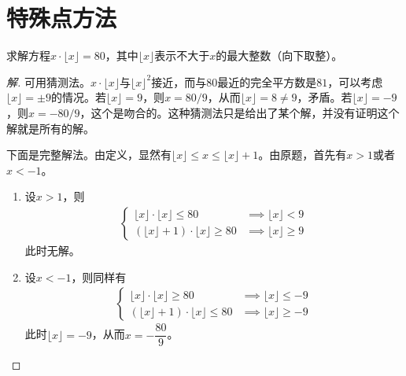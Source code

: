\section{特殊点方法}
\label{sec:special-point-method}

\begin{example}
  求解方程$x\cdot \lfloor x\rfloor=80$，其中$\lfloor x\rfloor$表示不大于$x$的最大整数（向下取整）。
\end{example}
\begin{proof}[解]
  可用猜测法。$x\cdot \lfloor x\rfloor$与$\lfloor x\rfloor ^2$接近，而与$80$最近的完全平方数是$81$，可以考虑$\lfloor x\rfloor=\pm 9$的情况。若$\lfloor x\rfloor=9$，则$x=80/9$，从而$\lfloor x\rfloor=8\ne 9$，矛盾。若$\lfloor x\rfloor=-9$，则$x=-80/9$，这个是吻合的。这种猜测法只是给出了某个解，并没有证明这个解就是所有的解。

  下面是完整解法。由定义，显然有$\lfloor x\rfloor\le x \le \lfloor x\rfloor + 1$。由原题，首先有$x>1$或者$x<-1$。

  \begin{enumerate}
  \item 设$x>1$，则
    \begin{align*}
      \begin{cases}
        \lfloor x\rfloor \cdot \lfloor x\rfloor  \le 80 &\implies \lfloor x\rfloor < 9\\
        \left(\lfloor x\rfloor + 1\right)\cdot \lfloor x\rfloor \ge 80 &\implies \lfloor x\rfloor \ge 9
      \end{cases}
    \end{align*}
    此时无解。
  \item 设$x<-1$，则同样有
    \begin{align*}
      \begin{cases}
        \lfloor x\rfloor \cdot \lfloor x\rfloor  \ge 80 &\implies \lfloor x\rfloor \le -9\\
        \left(\lfloor x\rfloor + 1\right)\cdot \lfloor x\rfloor \le 80 &\implies \lfloor x\rfloor \ge -9
      \end{cases}
    \end{align*}
    此时$\lfloor x\rfloor=-9$，从而$x=-\dfrac{80}{9}$。\qedhere
  \end{enumerate}
\end{proof}


